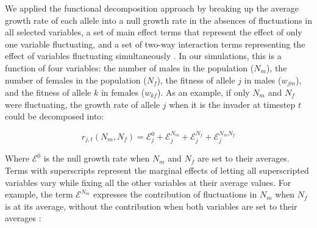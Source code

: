 

We applied the functional decomposition approach by breaking up the average growth rate of each allele into a null growth rate in the absences of fluctuations in all selected variables, a set of main effect terms that represent the effect of only one variable fluctuating, and a set of two-way interaction terms representing the effect of variables fluctuating simultaneously \citep{ellner_expanded_2019}. In our simulations, this is a function of four variables: the number of males in the population ($N_{m}$), the number of females in the population ($N_{f}$), the fitness of allele $j$ in males ($w_{jm}$), and the fitness of allele $k$ in females ($w_{kf}$). As an example, if only $N_{m}$ and $N_{f}$ were fluctuating, the growth rate of allele $j$ when it is the invader at timestep $t$ could be decomposed into:

\begin{equation}
   r_{j,t}(N_{m},N_{f}) = \mathcal{E}_{j}^{0} + \mathcal{E}_{j}^{N_{m}}+ \mathcal{E}_{j}^{N_{f}}+ \mathcal{E}_{j}^{N_{m}N_{f}}
   \label{functional_decomp}
\end{equation}

Where $\mathcal{E}^0$ is the null growth rate when $N_{m}$ and $N_{f}$ are set to their averages. Terms with superscripts represent the marginal effects of letting all superscripted variables vary while fixing all the other variables at their average values. For example, the term $\mathcal{E}^{N_{m}}$ expresses the contribution of fluctuations in $N_{m}$ when $N_{f}$ is at its average, without the contribution when both variables are set to their averages :

